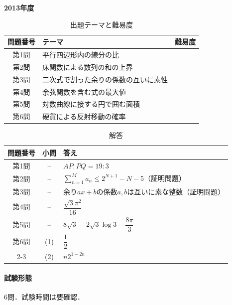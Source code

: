 \documentclass[../../main.tex]{subfiles}
\begin{document}
\begin{center}
  {\fontsize{48pt}{58pt}\selectfont \textbf{2013}\normalsize\textbf{年度}}
\end{center}

\begin{table}[htb]
  \centering
  \caption{出題テーマと難易度}
  \begin{tabular}{|c|p{9cm}|c|}
    \hline
    \textbf{問題番号} & \textbf{テーマ} & \textbf{難易度} \\
    \hline
    第1問 & 平行四辺形内の線分の比 & \\
    \hline
    第2問 & 床関数による数列の和の上界 & \\
    \hline
    第3問 & 二次式で割った余りの係数の互いに素性 & \\
    \hline
    第4問 & 余弦関数を含む式の最大値 & \\
    \hline
    第5問 & 対数曲線に接する円で囲む面積 & \\
    \hline
    第6問 & 硬貨による反射移動の確率 & \\
    \hline
  \end{tabular}
\end{table}

\begin{table}[htb]
  \centering
  \caption{解答}
  \renewcommand{\arraystretch}{1.4}
  \begin{tabular}{|c|c|p{9cm}|}
    \hline
    \textbf{問題番号} & \textbf{小問} & \textbf{答え} \\
    \hline
    第1問 & -- & $AP:PQ=19:3$ \\
    \hline
    第2問 & -- & $\sum_{n=1}^M a_n\le2^{N+1}-N-5$（証明問題） \\
    \hline
    第3問 & -- & 余り$ax+b$の係数$a,b$は互いに素な整数（証明問題） \\
    \hline
    第4問 & -- & $\dfrac{\sqrt{3}\pi^2}{16}$ \\
    \hline
    第5問 & -- & $8\sqrt{3}-2\sqrt{3}\log3-\dfrac{8\pi}{3}$ \\
    \hline
    第6問 & (1) & $\dfrac{1}{2}$ \\
    \cline{2-3}
    & (2) & $n2^{1-2n}$ \\
    \hline
  \end{tabular}
\end{table}

\paragraph{試験形態}
6問．試験時間は要確認．
\end{document}
